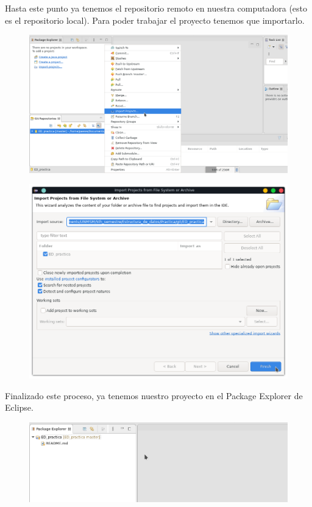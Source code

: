 \documentclass{article}
\begin{document}
Hasta este punto ya tenemos el repositorio remoto en nuestra computadora (esto
es el repositorio local). Para poder trabajar el proyecto tenemos que
importarlo.

\begin{figure}[h!]
  \centering
  \includegraphics[scale=0.55]{./Pictures/017_importar_repo.png}
\end{figure}

\newpage

\begin{figure}[h!]
  \centering
  \includegraphics[scale=0.75]{./Pictures/018_save_import.png}
\end{figure}

Finalizado este proceso, ya tenemos nuestro proyecto en el Package Explorer de
Eclipse.

\begin{figure}[h!]
  \centering
  \includegraphics[scale=0.75]{./Pictures/019_project_imported.png}
\end{figure}
\end{document}
